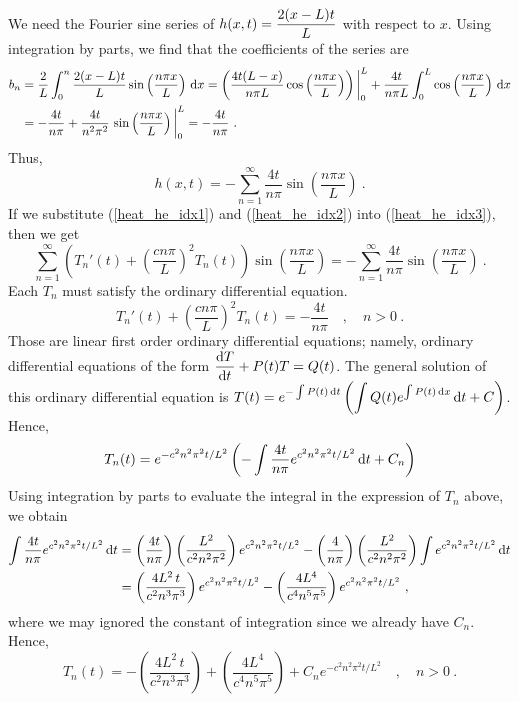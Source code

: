 \begin{egg}
We need the Fourier sine series of
$\displaystyle h(x,t) = \frac{2(x-L)t}{L}$
with respect to $x$.  Using integration by parts, we find that the
coefficients of the series are
\begin{align*}
b_n &= \frac{2}{L}\int_0^n \frac{2(x-L)t}{L}
\sin\left(\frac{n\pi x}{L}\right) \,\mathrm{d}{x}
= \left( \frac{4t(L-x)}{n\pi L} 
\cos\left(\frac{n\pi x}{L}\right)\right)\bigg|_0^L 
+ \frac{4t}{n\pi L} \int_0^L \cos\left(\frac{n\pi x}{L}\right) \,\mathrm{d}{x} \\
&= -\frac{4t}{n\pi} + \frac{4t}{n^2\pi^2} \,
\sin\left(\frac{n\pi x}{L}\right)\bigg|_0^L
= -\frac{4t}{n\pi}  \ .
\end{align*}
Thus,
\begin{equation} \label{heat_he_idx2}
h(x,t) = -\sum_{n=1}^\infty \frac{4t}{n\pi} \sin\left(\frac{n\pi x}{L}\right) \ .
\end{equation}
If we substitute (\ref{heat_he_idx1}) and (\ref{heat_he_idx2}) into
(\ref{heat_he_idx3}), then we get
\[
\sum_{n=1}^\infty \left( T_n'(t) + \left(\frac{c n\pi}{L}\right)^2
T_n(t) \right) \sin\left(\frac{n\pi x}{L}\right) =
-\sum_{n=1}^\infty \frac{4t}{n\pi} \sin\left(\frac{n\pi x}{L}\right) \ .
\]
Each $T_n$ must satisfy the ordinary differential equation.
\[
T_n'(t) + \left(\frac{c n\pi}{L}\right)^2 T_n(t) = - \frac{4t}{n\pi}
\quad , \quad n>0 \ .
\]
Those are linear first order ordinary differential equations; namely,
ordinary differential equations of the form 
$\displaystyle \frac{\mathrm{d}T}{\mathrm{d}{t}} + P(t)T = Q(t)$.
The general solution of this ordinary differential equation is
$\displaystyle T(t) = e^{-\int P(t)\,\mathrm{d}{t}}
\left(\int Q(t) e^{\int P(t)\,\mathrm{d}{x}} \,\mathrm{d}{t} + C \right)$.
Hence,
\[
T_n(t) = e^{-c^2n^2\pi^2 t/L^2} \left( - \int \frac{4t}{n\pi}
e^{c^2n^2\pi^2 t/L^2} \,\mathrm{d}{t} + C_n \right)
\]
Using integration by parts to evaluate the integral in the
expression of $T_n$ above, we obtain
\begin{align*}
\int \frac{4t}{n\pi} e^{c^2n^2\pi^2 t/L^2} \,\mathrm{d}{t} &=
\left(\frac{4t}{n\pi}\right)\left(\frac{L^2}{c^2n^2\pi^2}\right)
e^{c^2n^2\pi^2 t/L^2}
- \left(\frac{4}{n\pi}\right)\left(\frac{L^2}{c^2n^2\pi^2}\right)
\int e^{c^2n^2\pi^2 t/L^2} \,\mathrm{d}{t} \\
&= \left(\frac{4L^2\,t}{c^2n^3\pi^3}\right) e^{c^2n^2\pi^2 t/L^2}
- \left(\frac{4L^4}{c^4n^5\pi^5}\right) e^{c^2n^2\pi^2 t/L^2} \ ,
\end{align*}
where we may ignored the constant of integration since we already have
$C_n$.  Hence,
\[
T_n(t) = -\left(\frac{4L^2\,t}{c^2n^3\pi^3}\right)
+ \left(\frac{4L^4}{c^4n^5\pi^5}\right) + C_n e^{-c^2n^2\pi^2 t/L^2}
\quad , \quad n > 0 \ .
\]


\end{egg}

